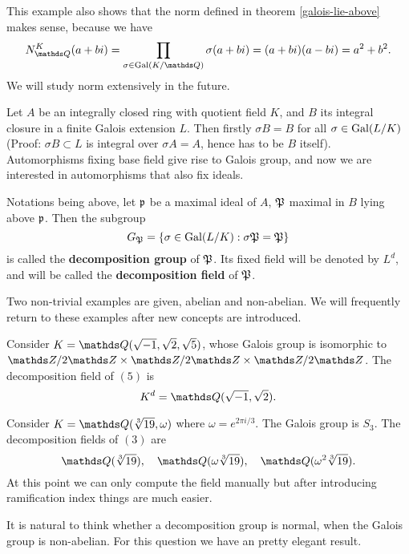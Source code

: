 		This example also shows that the norm defined in theorem \ref{galois-lie-above} makes sense, because we have
		\[
		N_{\Q}^{K}(a+bi)=\prod_{\sigma \in \gal(K/\Q)}\sigma(a+bi) = (a+bi)(a-bi)=a^2+b^2.
		\]
		We will study norm extensively in the future. %
		
		Let $A$ be an integrally closed ring with quotient field $K$, and $B$ its integral closure in a finite Galois extension $L$. Then firstly $\sigma{B}=B$ for all $\sigma \in \operatorname{Gal}(L/K)$ (Proof: $\sigma{B} \subset L$ is integral over $\sigma{A}=A$, hence has to be $B$ itself). Automorphisms fixing base field give rise to Galois group, and now we are interested in automorphisms that also fix ideals. 
		
		\begin{definition}
			Notations being above, let $\mathfrak{p}$ be a maximal ideal of $A$, $\mathfrak{P}$ maximal in $B$ lying above $\mathfrak{p}$. Then the subgroup
			\[
				G_\mathfrak{P} = \{\sigma \in \operatorname{Gal}(L/K):\sigma\mathfrak{P}=\mathfrak{P}\}
			\]
			is called the \textbf{decomposition group} of $\mathfrak{P}$. Its fixed field will be denoted by $L^d$, and will be called the \textbf{decomposition field} of $\mathfrak{P}$. 
		\end{definition}
		Two non-trivial examples are given, abelian and non-abelian. We will frequently return to these examples after new concepts are introduced. 
		\begin{example}
			Consider $K = \Q(\sqrt{-1},\sqrt{2},\sqrt{5})$, whose Galois group is isomorphic to $\Z/2\Z \times \Z/2\Z \times \Z/2\Z$. The decomposition field of $(5)$ is
			\[
				K^d = \Q(\sqrt{-1},\sqrt{2}).
			\]
		\end{example}
		\begin{example}
			Consider $K = \Q(\sqrt[3]{19},\omega)$ where $\omega = e^{2\pi i/3}$. The Galois group is $S_3$. The decomposition fields of $(3)$ are
			\[
				\Q(\sqrt[3]{19}),\quad \Q(\omega\sqrt[3]{19}),\quad\Q(\omega^2\sqrt[3]{19}).
			\]
			At this point we can only compute the field manually but after introducing ramification index things are much easier. 
		\end{example}
	
		It is natural to think whether a decomposition group is normal, when the Galois group is non-abelian. For this question we have an pretty elegant result. 
		
